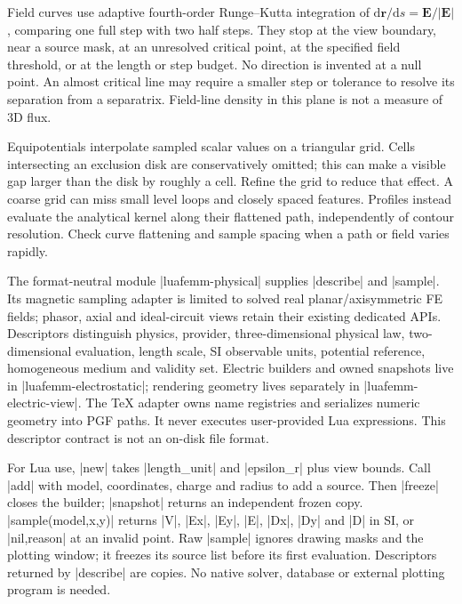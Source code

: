 Field curves use adaptive fourth-order Runge--Kutta integration of
$\mathrm d\mathbf r/\mathrm ds=\mathbf E/|\mathbf E|$, comparing one full step
with two half steps. They stop at the view boundary, near a source mask, at an
unresolved critical point, at the specified field threshold, or at the length
or step budget. No direction is invented at a null point. An almost critical
line may require a smaller step or tolerance to resolve its separation from a
separatrix. Field-line density in this plane is not a measure of 3D flux.

Equipotentials interpolate sampled scalar values on a triangular grid.
Cells intersecting an exclusion disk are conservatively omitted; this can make
a visible gap larger than the disk by roughly a cell. Refine the grid to reduce
that effect. A coarse grid can miss small level loops and closely spaced
features. Profiles instead evaluate the analytical kernel along their
flattened path, independently of contour resolution. Check curve flattening
and sample spacing when a path or field varies rapidly.

The format-neutral module |luafemm-physical| supplies |describe| and |sample|.
Its magnetic sampling adapter is limited to solved real planar/axisymmetric FE
fields; phasor, axial and ideal-circuit views retain their existing dedicated APIs.
Descriptors distinguish physics, provider, three-dimensional physical law,
two-dimensional evaluation, length scale, SI observable units, potential
reference, homogeneous medium and validity set. Electric builders and owned
snapshots live in |luafemm-electrostatic|; rendering geometry lives separately
in |luafemm-electric-view|. The TeX adapter owns name registries and serializes
numeric geometry into PGF paths. It never executes user-provided Lua expressions.
This descriptor contract is not an on-disk file format.

For Lua use, |new| takes |length_unit| and |epsilon_r| plus view bounds.
Call |add| with model, coordinates, charge and radius to add a source.
Then |freeze| closes the builder;
|snapshot| returns an independent frozen copy. |sample(model,x,y)| returns
|V|, |Ex|, |Ey|, |E|, |Dx|, |Dy| and |D| in SI, or |nil,reason| at an invalid
point. Raw |sample| ignores drawing masks and the plotting window; it freezes
its source list before its first evaluation. Descriptors returned by |describe|
are copies. No native solver, database or external plotting program is needed.
